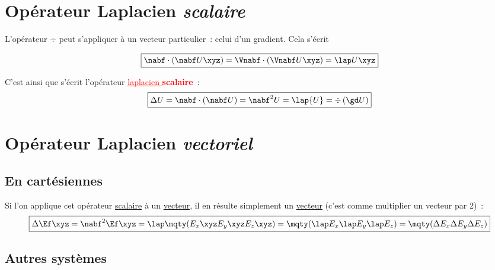 \documentclass[a4paper, 12pt, garamond]{book}
\begin{document}
\section{Opérateur Laplacien \textit{scalaire}}

L'opérateur $\div$ peut s'appliquer à un vecteur particulier~: celui d'un
gradient. Cela s'écrit

\textcolor{brandeisblue}{
	\begin{equation*}
		\boxed{
			\nabf\cdot\left(\nabf U\xyz\right) =
			\Vnabf\cdot\left(\Vnabf U\xyz\right) =
			\lap U\xyz}
	\end{equation*}
}

C'est ainsi que s'écrit l'opérateur \textcolor{red}{\ul{laplacien
	}\textbf{scalaire}}~:
\textcolor{red}{
	\begin{equation*}
		\boxed{
			\Delta U =
			\nabf\cdot\left(\nabf U\right) =
			\nabf^2 U =
			\lap{U} =
			\div\left(\gd U\right)
		}
	\end{equation*}
}

\section{Opérateur Laplacien \textit{vectoriel}}
\subsection{En cartésiennes}

Si l'on applique cet opérateur \ul{scalaire} à un \ul{vecteur}, il en résulte simplement un \ul{vecteur} (c'est comme multiplier un vecteur par 2)~:
\textcolor{brandeisblue}{
	\begin{equation*}
		\boxed{
			\Delta \Ef\xyz =
			\nabf^2\Ef\xyz =
			\lap\mqty(E_x\xyz\\E_y\xyz\\E_z\xyz) =
			\mqty(\lap E_x\\\lap E_y\\\lap E_z) =
			\mqty(\Delta E_x\\\Delta E_y\\\Delta E_z)
		}
	\end{equation*}
}

\subsection{Autres systèmes}
\end{document}
